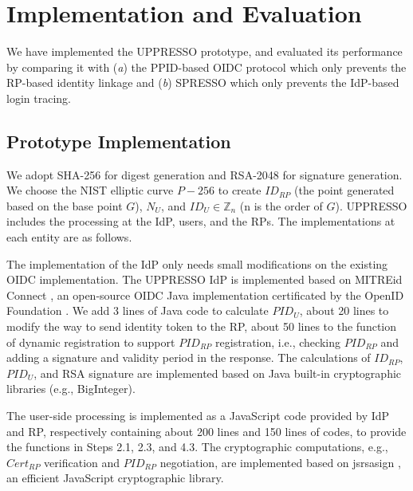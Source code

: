 \section{Implementation and Evaluation}
\label{sec:implementation}
We have implemented the UPPRESSO prototype, and evaluated its performance
 by comparing it with (\emph{a}) the PPID-based OIDC protocol
    which only prevents the RP-based identity linkage and (\emph{b}) SPRESSO which only prevents the IdP-based login tracing.

\subsection{Prototype Implementation}
We adopt SHA-256 for digest generation and  RSA-2048 for signature generation. %
We choose the NIST elliptic curve $P-256$ to create $ID_{RP}$ (the point generated based on the base point $G$), $N_U$, and $ID_U \in \mathbb{Z}_n$ (n is the order of $G$).
UPPRESSO includes the processing at the IdP, users, and the RPs.
The implementations at each entity are as follows.

The implementation of the IdP only needs small modifications on the existing OIDC implementation.
The UPPRESSO IdP is implemented based on MITREid Connect \cite{MITREid}, an open-source OIDC Java implementation certificated by the OpenID Foundation \cite{OIDF}.
We add 3 lines of Java code to calculate $PID_U$, about 20 lines to modify the way to send identity token to the RP,
about 50 lines to the function of dynamic registration to support $PID_{RP}$ registration,
 i.e., checking $PID_{RP}$ and adding a signature and validity period in the response.  %
The calculations of $ID_{RP}$, $PID_U$, and RSA signature are implemented based on Java built-in cryptographic libraries (e.g., BigInteger).

The user-side processing is implemented as a JavaScript code provided by IdP and RP, respectively containing about 200 lines and 150 lines of codes,
to provide the functions in Steps 2.1, 2.3, and 4.3.
The cryptographic computations, e.g., $Cert_{RP}$ verification and $PID_{RP}$ negotiation, are implemented based on jsrsasign \cite{jsrsasign}, an efficient JavaScript cryptographic library.

